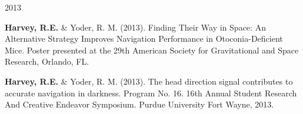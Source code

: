 \begin{cventries}
\cventry
    {} %
    {} %
    {} %
    {2013} %
    {
      \begin{cvitems} %
      \setlength\itemsep{0.35em}
        \item {\textbf{Harvey, R.E.} \& Yoder, R. M. (2013). Finding Their Way in Space: An Alternative Strategy Improves Navigation Performance in Otoconia-Deficient Mice. Poster presented at the 29th American Society for Gravitational and Space Research, Orlando, FL.}
        \item {\textbf{Harvey, R.E.} \& Yoder, R. M. (2013). The head direction signal contributes to accurate navigation in darkness. Program No. 16. 16th Annual Student Research And Creative Endeavor Symposium. Purdue University Fort Wayne, 2013.}
      \end{cvitems}
    }
\end{cventries}